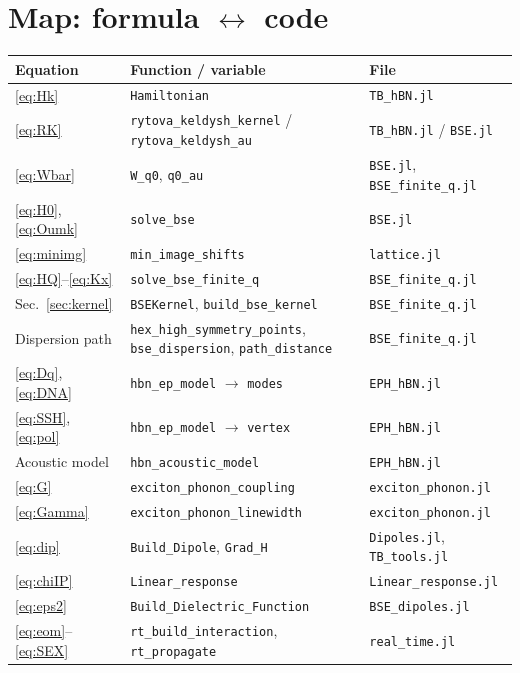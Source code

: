 \documentclass[11pt,a4paper]{article}
\newcommand{\code}[1]{\texttt{#1}}
\begin{document}
\section{Map: formula $\leftrightarrow$ code}
\label{app:map}

\begin{center}
\footnotesize
\begin{tabular}{@{}lll@{}}
\toprule
Equation & Function / variable & File \\
\midrule
\eqref{eq:Hk} & \code{Hamiltonian} & \code{TB\_hBN.jl} \\
\eqref{eq:RK} & \code{rytova\_keldysh\_kernel} / \code{rytova\_keldysh\_au} & \code{TB\_hBN.jl} / \code{BSE.jl} \\
\eqref{eq:Wbar} & \code{W\_q0}, \code{q0\_au} & \code{BSE.jl}, \code{BSE\_finite\_q.jl} \\
\eqref{eq:H0}, \eqref{eq:Oumk} & \code{solve\_bse} & \code{BSE.jl} \\
\eqref{eq:minimg} & \code{min\_image\_shifts} & \code{lattice.jl} \\
\eqref{eq:HQ}--\eqref{eq:Kx} & \code{solve\_bse\_finite\_q} & \code{BSE\_finite\_q.jl} \\
Sec.~\ref{sec:kernel} & \code{BSEKernel}, \code{build\_bse\_kernel} & \code{BSE\_finite\_q.jl} \\
Dispersion path & \code{hex\_high\_symmetry\_points}, \code{bse\_dispersion}, \code{path\_distance} & \code{BSE\_finite\_q.jl} \\
\eqref{eq:Dq}, \eqref{eq:DNA} & \code{hbn\_ep\_model} $\to$ \code{modes} & \code{EPH\_hBN.jl} \\
\eqref{eq:SSH}, \eqref{eq:pol} & \code{hbn\_ep\_model} $\to$ \code{vertex} & \code{EPH\_hBN.jl} \\
Acoustic model & \code{hbn\_acoustic\_model} & \code{EPH\_hBN.jl} \\
\eqref{eq:G} & \code{exciton\_phonon\_coupling} & \code{exciton\_phonon.jl} \\
\eqref{eq:Gamma} & \code{exciton\_phonon\_linewidth} & \code{exciton\_phonon.jl} \\
\eqref{eq:dip} & \code{Build\_Dipole}, \code{Grad\_H} & \code{Dipoles.jl}, \code{TB\_tools.jl} \\
\eqref{eq:chiIP} & \code{Linear\_response} & \code{Linear\_response.jl} \\
\eqref{eq:eps2} & \code{Build\_Dielectric\_Function} & \code{BSE\_dipoles.jl} \\
\eqref{eq:eom}--\eqref{eq:SEX} & \code{rt\_build\_interaction}, \code{rt\_propagate} & \code{real\_time.jl} \\

\end{tabular}
\end{center}
\end{document}

